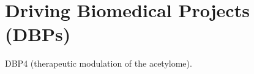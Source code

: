 \documentclass[arial,11pt]{article}
\begin{document}
\section{Driving Biomedical Projects (DBPs)}

DBP4 (therapeutic modulation of the acetylome).



%


\end{document}
